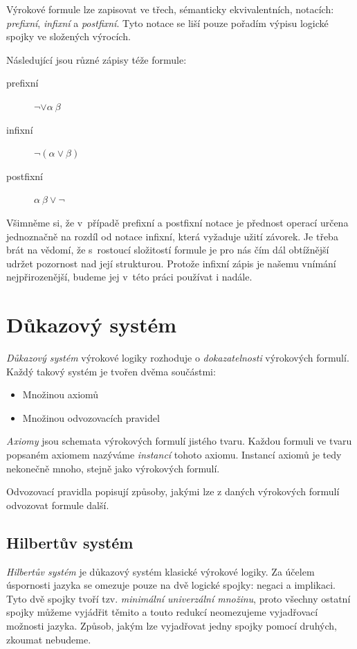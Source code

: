 \documentclass[thesis=B,czech,hidelinks]{thesis}[2012/06/26]
\begin{document}
Výrokové formule lze zapisovat ve třech, sémanticky ekvivalentních, notacích: \emph{prefixní}, \emph{infixní} a \emph{postfixní}. Tyto notace se liší pouze pořadím výpisu logické spojky ve složených výrocích.

\begin{exm}
Následující jsou různé zápisy téže formule:
\begin{description}
	\item[prefixní] $\neg \vee \alpha \: \beta$
	\item[infixní] $\neg (\alpha \vee \beta)$
	\item[postfixní] $\alpha \: \beta \vee \neg$
\end{description}
\end{exm}

Všimněme si, že v~případě prefixní a postfixní notace je přednost operací určena jednoznačně na rozdíl od notace infixní, která vyžaduje užití závorek. Je třeba brát na vědomí, že s~rostoucí složitostí formule je pro nás čím dál obtížnější udržet pozornost nad její strukturou. Protože infixní zápis je našemu vnímání nejpřirozenější, budeme jej v~této práci používat i nadále.

\section{Důkazový systém}
\label{sec:proof_system}

\emph{Důkazový systém} výrokové logiky rozhoduje o \emph{dokazatelnosti} výrokových formulí. Každý takový systém je tvořen dvěma součástmi:

\begin{itemize}
	\item Množinou axiomů
	\item Množinou odvozovacích pravidel
\end{itemize}

\emph{Axiomy} jsou schemata výrokových formulí jistého tvaru. Každou formuli ve tvaru popsaném axiomem nazýváme \emph{instancí} tohoto axiomu. Instancí axiomů je tedy nekonečně mnoho, stejně jako výrokových formulí.

Odvozovací pravidla popisují způsoby, jakými lze z daných výrokových formulí odvozovat formule další.

\subsection{Hilbertův systém}

\emph{Hilbertův systém} je důkazový systém klasické výrokové logiky. Za účelem úspornosti jazyka se omezuje pouze na dvě logické spojky: negaci a implikaci. Tyto dvě spojky tvoří tzv. \emph{minimální univerzální množinu}, proto všechny ostatní spojky můžeme vyjádřit těmito a touto redukcí neomezujeme vyjadřovací možnosti jazyka\cite{stary}. Způsob, jakým lze vyjadřovat jedny spojky pomocí druhých, zkoumat nebudeme.
\end{document}
